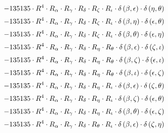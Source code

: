 \begin{subequations}
\begin{gather}
 \\[0.2em] \notag 		 - 135135 \cdot R^{4} \cdot R_{\alpha{}} \cdot R_{\gamma{}} \cdot R_{\delta{}} \cdot R_{\zeta{}} \cdot R_{\iota{}} \cdot \delta{}\left(\beta{}, \epsilon{}\right) \cdot \delta{}\left(\eta{}, \theta{}\right) 
 \\[0.2em] \notag 		 - 135135 \cdot R^{4} \cdot R_{\alpha{}} \cdot R_{\gamma{}} \cdot R_{\delta{}} \cdot R_{\zeta{}} \cdot R_{\iota{}} \cdot \delta{}\left(\beta{}, \eta{}\right) \cdot \delta{}\left(\epsilon{}, \theta{}\right) 
 \\[0.2em] \notag 		 - 135135 \cdot R^{4} \cdot R_{\alpha{}} \cdot R_{\gamma{}} \cdot R_{\delta{}} \cdot R_{\zeta{}} \cdot R_{\iota{}} \cdot \delta{}\left(\beta{}, \theta{}\right) \cdot \delta{}\left(\epsilon{}, \eta{}\right) 
 \\[0.2em] \notag 		 - 135135 \cdot R^{4} \cdot R_{\alpha{}} \cdot R_{\gamma{}} \cdot R_{\delta{}} \cdot R_{\eta{}} \cdot R_{\theta{}} \cdot \delta{}\left(\beta{}, \epsilon{}\right) \cdot \delta{}\left(\zeta{}, \iota{}\right) 
 \\[0.2em] \notag 		 - 135135 \cdot R^{4} \cdot R_{\alpha{}} \cdot R_{\gamma{}} \cdot R_{\delta{}} \cdot R_{\eta{}} \cdot R_{\theta{}} \cdot \delta{}\left(\beta{}, \zeta{}\right) \cdot \delta{}\left(\epsilon{}, \iota{}\right) 
 \\[0.2em] \notag 		 - 135135 \cdot R^{4} \cdot R_{\alpha{}} \cdot R_{\gamma{}} \cdot R_{\delta{}} \cdot R_{\eta{}} \cdot R_{\theta{}} \cdot \delta{}\left(\beta{}, \iota{}\right) \cdot \delta{}\left(\epsilon{}, \zeta{}\right) 
 \\[0.2em] \notag 		 - 135135 \cdot R^{4} \cdot R_{\alpha{}} \cdot R_{\gamma{}} \cdot R_{\delta{}} \cdot R_{\eta{}} \cdot R_{\iota{}} \cdot \delta{}\left(\beta{}, \epsilon{}\right) \cdot \delta{}\left(\zeta{}, \theta{}\right) 
 \\[0.2em] \notag 		 - 135135 \cdot R^{4} \cdot R_{\alpha{}} \cdot R_{\gamma{}} \cdot R_{\delta{}} \cdot R_{\eta{}} \cdot R_{\iota{}} \cdot \delta{}\left(\beta{}, \zeta{}\right) \cdot \delta{}\left(\epsilon{}, \theta{}\right) 
 \\[0.2em] \notag 		 - 135135 \cdot R^{4} \cdot R_{\alpha{}} \cdot R_{\gamma{}} \cdot R_{\delta{}} \cdot R_{\eta{}} \cdot R_{\iota{}} \cdot \delta{}\left(\beta{}, \theta{}\right) \cdot \delta{}\left(\epsilon{}, \zeta{}\right) 
 \\[0.2em] \notag 		 - 135135 \cdot R^{4} \cdot R_{\alpha{}} \cdot R_{\gamma{}} \cdot R_{\delta{}} \cdot R_{\theta{}} \cdot R_{\iota{}} \cdot \delta{}\left(\beta{}, \epsilon{}\right) \cdot \delta{}\left(\zeta{}, \eta{}\right) 

\end{gather}
\end{subequations}
